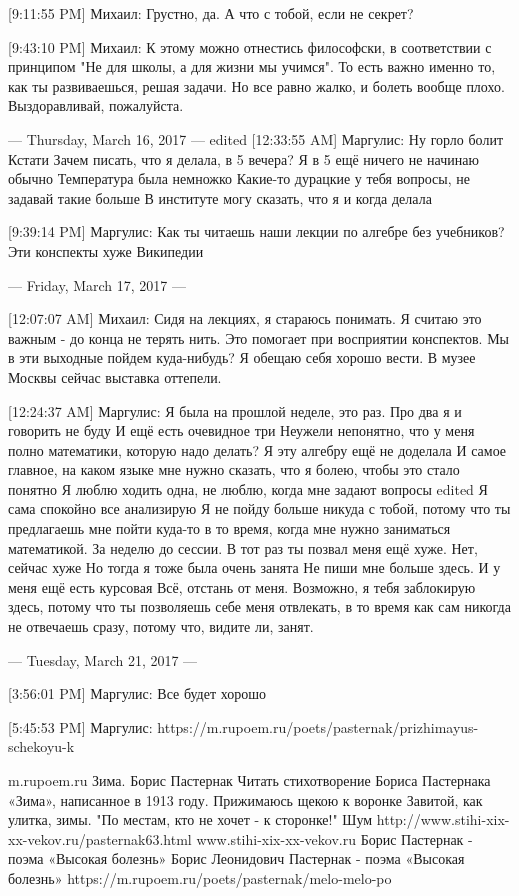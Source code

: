 \documentclass{article}
\begin{document}
[9:11:55 PM] Михаил:
Грустно, да. А что с тобой, если не секрет?

[9:43:10 PM] Михаил:
К этому можно отнестись философски, в соответствии с принципом "Не для школы, а для жизни мы учимся". То есть важно именно то, как ты развиваешься, решая задачи. Но все равно жалко, и болеть вообще плохо. Выздоравливай, пожалуйста.

--- Thursday, March 16, 2017 ---
edited 
[12:33:55 AM] Маргулис:
Ну горло болит
 Кстати
 Зачем писать, что я делала, в 5 вечера?
 Я в 5 ещё ничего не начинаю обычно
 Температура была немножко
 Какие-то дурацкие у тебя вопросы, не задавай такие больше
 В институте могу сказать, что я и когда делала

[9:39:14 PM] Маргулис:
Как ты читаешь наши лекции по алгебре без учебников? Эти конспекты хуже Википедии

--- Friday, March 17, 2017 ---

[12:07:07 AM] Михаил:
Сидя на лекциях, я стараюсь понимать.
 Я считаю это важным - до конца не терять нить. Это помогает при восприятии конспектов.
 Мы в эти выходные пойдем куда-нибудь? Я обещаю себя хорошо вести. В музее Москвы сейчас выставка оттепели.

[12:24:37 AM] Маргулис:
Я была на прошлой неделе, это раз.
 Про два я и говорить не буду
 И ещё есть очевидное три
 Неужели непонятно, что у меня полно математики, которую надо делать? Я эту алгебру ещё не доделала
 И самое главное, на каком языке мне нужно сказать, что я болею, чтобы это стало понятно
 Я люблю ходить одна, не люблю, когда мне задают вопросы
edited 
Я сама спокойно все анализирую
 Я не пойду больше никуда с тобой, потому что ты предлагаешь мне пойти куда-то в то время, когда мне нужно заниматься математикой. За неделю до сессии. В тот раз ты позвал меня ещё хуже.
 Нет, сейчас хуже
 Но тогда я тоже была очень занята
 Не пиши мне больше здесь.
 И у меня ещё есть курсовая
 Всё, отстань от меня.
 Возможно, я тебя заблокирую здесь, потому что ты позволяешь себе меня отвлекать, в то время как сам никогда не отвечаешь сразу, потому что, видите ли, занят.

--- Tuesday, March 21, 2017 ---

[3:56:01 PM] Маргулис:
Все будет хорошо

[5:45:53 PM] Маргулис:
https://m.rupoem.ru/poets/pasternak/prizhimayus-schekoyu-k

m.rupoem.ru
Зима. Борис Пастернак
Читать стихотворение Бориса Пастернака «Зима», написанное в 1913 году. Прижимаюсь щекою к воронке Завитой, как улитка, зимы. "По местам, кто не хочет - к сторонке!" Шум
 http://www.stihi-xix-xx-vekov.ru/pasternak63.html
www.stihi-xix-xx-vekov.ru
Борис Пастернак - поэма «Высокая болезнь»
Борис Леонидович Пастернак - поэма «Высокая болезнь»
 https://m.rupoem.ru/poets/pasternak/melo-melo-po
\end{document}
